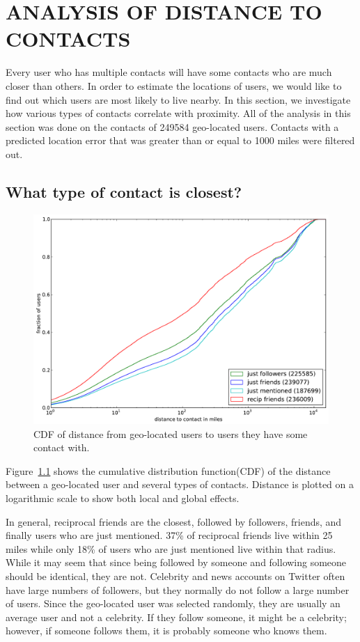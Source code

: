 
\chapter{\uppercase{Analysis of Distance to Contacts}}

Every user who has multiple contacts will have some contacts who are much
closer than others. In order to estimate the locations of users, we would like
to find out which users are most likely to live nearby.  In this section, we
investigate how various types of contacts correlate with proximity.
All of the analysis in this section was done on the contacts of 249584 geo-located users.
Contacts with a predicted location error that was greater than or equal to 1000
miles were filtered out.

\section{What type of contact is closest?}
\label{sec:EdgeTypes}

\begin{figure}[tb]
\centering
\includegraphics[width=\linewidth]{figures/edge_types_cuml.pdf}
\caption{
CDF of distance from geo-located users to users they have some contact
with.
}
\label{fig:EdgeTypesCum}
\end{figure}

Figure~\ref{fig:EdgeTypesCum} shows the cumulative distribution
function(CDF) of the distance between a geo-located user and several types of
contacts.
Distance is plotted on a logarithmic scale to show both local and
global effects.

In general, reciprocal friends are the closest, followed by followers, friends,
and finally users who are just mentioned.
37\% of reciprocal friends live within 25 miles while only 18\% of users
who are just mentioned live within that radius.
While it may seem that since being followed by someone and following someone
should be identical, they are not.
Celebrity and news accounts on Twitter often have large numbers of followers,
but they normally do not follow a large number of users.
Since the geo-located user was selected randomly, they are usually an average
user and not a celebrity.
If they follow someone, it might be a celebrity; however, if someone follows
them, it is probably someone who knows them.

